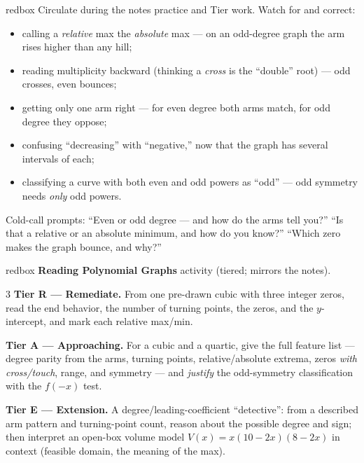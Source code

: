 \documentclass[10pt]{article}
\begin{document}
\begin{skillbox}{redbox}
Circulate during the notes practice and Tier work. Watch for and correct:
\begin{itemize}[leftmargin=1.2em, nosep]
  \item calling a \emph{relative} max the \emph{absolute} max --- on an odd-degree graph the arm rises higher than any hill;
  \item reading multiplicity backward (thinking a \emph{cross} is the ``double'' root) --- odd crosses, even bounces;
  \item getting only one arm right --- for even degree both arms match, for odd degree they oppose;
  \item confusing ``decreasing'' with ``negative,'' now that the graph has several intervals of each;
  \item classifying a curve with both even and odd powers as ``odd'' --- odd symmetry needs \emph{only} odd powers.
\end{itemize}
Cold-call prompts: ``Even or odd degree --- and how do the arms tell you?'' ``Is that a relative or
an absolute minimum, and how do you know?'' ``Which zero makes the graph bounce, and why?''
\end{skillbox}

\begin{skillbox}{redbox}
\textbf{Reading Polynomial Graphs} activity (tiered; mirrors the notes).
\begin{multicols}{3}
\textbf{Tier R --- Remediate.} From one pre-drawn cubic with three integer zeros, read the end
behavior, the number of turning points, the zeros, and the $y$-intercept, and mark each relative
max/min.

\columnbreak
\textbf{Tier A --- Approaching.} For a cubic and a quartic, give the full feature list --- degree
parity from the arms, turning points, relative/absolute extrema, zeros \emph{with cross/touch},
range, and symmetry --- and \emph{justify} the odd-symmetry classification with the $f(-x)$ test.

\columnbreak
\textbf{Tier E --- Extension.} A degree/leading-coefficient ``detective'': from a described arm
pattern and turning-point count, reason about the possible degree and sign; then interpret an
open-box volume model $V(x)=x(10-2x)(8-2x)$ in context (feasible domain, the meaning of the
max).
\end{multicols}
\end{skillbox}
\end{document}
